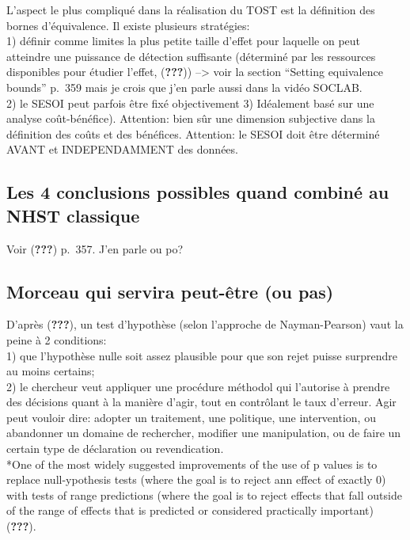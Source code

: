 \documentclass[
  english,
  man]{apa6}
\begin{document}
L'aspect le plus compliqué dans la réalisation du TOST est la définition des bornes d'équivalence. Il existe plusieurs stratégies:\\
1) définir comme limites la plus petite taille d'effet pour laquelle on peut atteindre une puissance de détection suffisante (déterminé par les ressources disponibles pour étudier l'effet, ({\textbf{???}})) --\textgreater{} voir la section \enquote{Setting equivalence bounds} p.~359 mais je crois que j'en parle aussi dans la vidéo SOCLAB.\\
2) le SESOI peut parfois être fixé objectivement
3) Idéalement basé sur une analyse coût-bénéfice). Attention: bien sûr une dimension subjective dans la définition des coûts et des bénéfices.
Attention: le SESOI doit être déterminé AVANT et INDEPENDAMMENT des données.

\hypertarget{les-4-conclusions-possibles-quand-combinuxe9-au-nhst-classique}{%
\subsection{Les 4 conclusions possibles quand combiné au NHST classique}\label{les-4-conclusions-possibles-quand-combinuxe9-au-nhst-classique}}

Voir ({\textbf{???}}) p.~357. J'en parle ou po?

\hypertarget{morceau-qui-servira-peut-uxeatre-ou-pas}{%
\subsection{Morceau qui servira peut-être (ou pas)}\label{morceau-qui-servira-peut-uxeatre-ou-pas}}

D'après ({\textbf{???}}), un test d'hypothèse (selon l'approche de Nayman-Pearson) vaut la peine à 2 conditions:\\
1) que l'hypothèse nulle soit assez plausible pour que son rejet puisse surprendre au moins certains;\\
2) le chercheur veut appliquer une procédure méthodol qui l'autorise à prendre des décisions quant à la manière d'agir, tout en contrôlant le taux d'erreur. Agir peut vouloir dire: adopter un traitement, une politique, une intervention, ou abandonner un domaine de rechercher, modifier une manipulation, ou de faire un certain type de déclaration ou revendication.\\
*One of the most widely suggested improvements of the use of p values is to replace null-ypothesis tests (where the goal is to reject ann effect of exactly 0) with tests of range predictions (where the goal is to reject effects that fall outside of the range of effects that is predicted or considered practically important) ({\textbf{???}}).
\end{document}
